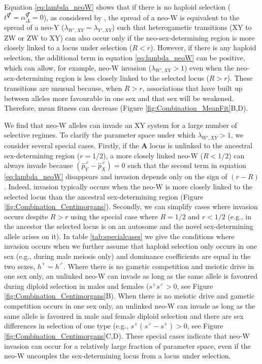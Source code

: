 \documentclass[12pt]{article}
\begin{document}
Equation \eqref{eq:lambda_neoW} shows that if there is no haploid selection ($t^\Hermaphrodite=\alpha^\Hermaphrodite_{\Delta}=0$), as considered by \citet{vanDoorn:2010hu}, the spread of a neo-W is equivalent to the spread of a neo-Y ($\lambda_{W',XY}=\lambda_{Y',XY}$) such that heterogametic transitions (XY to ZW or ZW to XY) can also occur only if the neo-sex-determining region is more closely linked to a locus under selection ($R<r$). 
However, if there is any haploid selection, the additional term in equation \eqref{eq:lambda_neoW} can be positive, which can allow, for example, neo-W invasion ($\lambda_{W',XY}>1$) even when the neo-sex-determining region is less closely linked to the selected locus ($R>r$). 
These transitions are unusual because, when $R>r$, associations that have built up between alleles more favourable in one sex and that sex will be weakened. 
Therefore, mean fitness can decrease (Figure \ref{fig:Combination_MeanFit}B,D). 

We find that neo-W alleles can invade an XY system for a large number of selective regimes. 
To clarify the parameter space under which $\lambda_{W',XY}>1$, we consider several special cases. 
Firstly, if the \textbf{A} locus is unlinked to the ancestral sex-determining region ($r=1/2$), a more closely linked neo-W ($R<1/2$) can always invade because $\left( \hat{p}^\male_Y-\hat{p}^\male_X \right)=0$ such that the second term in equation \eqref{eq:lambda_neoW} disappears and invasion depends only on the sign of $(r-R)$. 
Indeed, invasion typically occurs when the neo-W is more closely linked to the selected locus than the ancestral sex-determining region (Figure \ref{fig:Combination_Centimorgans}).
Secondly, we can simplify cases where invasion occurs despite $R>r$ using the special case where $R=1/2$ and $r<1/2$ (e.g., in the ancestor the selected locus is on an autosome and the novel sex-determining allele arises on it). 
In table \ref{tab:specialcases} we give the conditions where invasion occurs when we further assume that haploid selection only occurs in one sex (e.g., during male meiosis only) and dominance coefficients are equal in the two sexes, $h^\female=h^\male$. 
Where there is no gametic competition and meiotic drive in one sex only, an unlinked neo-W can invade as long as the same allele is favoured during diploid selection in males and females ($s^\female s^\male>0$, see Figure \ref{fig:Combination_Centimorgans}B). %
When there is no meiotic drive and gametic competition occurs in one sex only, an unlinked neo-W can invade as long as the same allele is favoured in male and female diploid selection and there are sex differences in selection of one type (e.g., $s^\female(s^\male-s^\female)>0$, see Figure \ref{fig:Combination_Centimorgans}C,D). %
These special cases indicate that neo-W invasion can occur for a relatively large fraction of parameter space, even if the neo-W uncouples the sex-determining locus from a locus under selection. 
\end{document}

